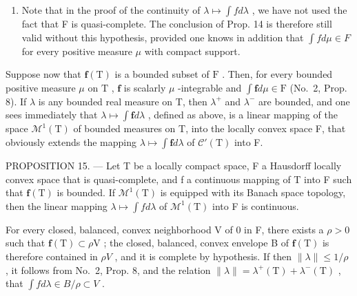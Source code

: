 \begin{enumerate}
\def\labelenumi{\arabic{enumi})}
\setcounter{enumi}{1}
\tightlist
\item
  Note that in the proof of the continuity of \(\lambda\mapsto\int f d\lambda\) , we have not used the fact that F is quasi-complete. The conclusion of Prop. 14 is therefore still valid without this hypothesis, provided one knows in addition that \(\int f d\mu\in F\) for every positive measure \(\mu\) with compact support.
\end{enumerate}

Suppose now that \(\mathbf{f}(\mathrm{T})\) is a bounded subset of \(\mathrm{F}\) . Then, for every bounded positive measure \(\mu\) on \(\mathrm{T}\) , \(\mathbf{f}\) is scalarly \(\mu\) -integrable and \(\int \mathbf{f}d\mu \in \mathrm{F}\) (No.~2, Prop. 8). If \(\lambda\) is any bounded real measure on T, then \(\lambda^{+}\) and \(\lambda^{-}\) are bounded, and one sees immediately that \(\lambda \mapsto \int \mathbf{f} d\lambda\) , defined as above, is a linear mapping of the space \(\mathcal{M}^1(\mathrm{T})\) of bounded measures on T, into the locally convex space F, that obviously extends the mapping \(\lambda \mapsto \int \mathbf{f} d\lambda\) of \(\mathcal{C}'(\mathrm{T})\) into F.

PROPOSITION 15. --- Let T be a locally compact space, F a Hausdorff locally convex space that is quasi-complete, and f a continuous mapping of T into F such that \(\mathbf{f}(\mathrm{T})\) is bounded. If \(\mathcal{M}^{1}(\mathrm{T})\) is equipped with its Banach space topology, then the linear mapping \(\lambda \mapsto \int f d\lambda\) of \(\mathcal{M}^{1}(\mathrm{T})\) into F is continuous.

For every closed, balanced, convex neighborhood V of 0 in F, there exists a \(\rho > 0\) such that \(\mathbf{f}(\mathrm{T}) \subset \rho\mathrm{V}\) ; the closed, balanced, convex envelope B of \(\mathbf{f}(\mathrm{T})\) is therefore contained in \(\rho V\) , and it is complete by hypothesis. If then \(\|\lambda\| \leqslant 1/\rho\) , it follows from No.~2, Prop. 8, and the relation \(\|\lambda\| = \lambda^{+}(\mathrm{T}) + \lambda^{-}(\mathrm{T})\) , that \(\int f d\lambda \in B/\rho \subset V\) .


